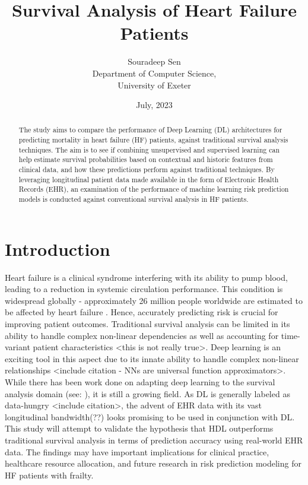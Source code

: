 \documentclass[%
 reprint,
 amsmath,amssymb,
 aps,
]{revtex4-2}
\begin{document}


\title{Survival Analysis of Heart Failure Patients}%
\author{Souradeep Sen \\
	 \small Department of Computer Science, \\ 
	 \small University of Exeter
	}

\date{July, 2023}%

\begin{abstract}
The study aims to compare the performance of Deep Learning (DL) architectures for predicting mortality in heart failure (HF) patients, against traditional survival analysis techniques. The aim is to see if combining unsupervised and supervised learning can help estimate survival probabilities based on contextual and historic features from clinical data, and how these predictions perform against traditional techniques. By leveraging longitudinal patient data made available in the form of Electronic Health Records (EHR), an examination of the performance of machine learning risk prediction models is conducted against conventional survival analysis in HF patients.
\end{abstract}

\maketitle

\section{\label{intro}Introduction}
Heart failure is a clinical syndrome interfering with its ability to pump blood, leading to a reduction in systemic circulation performance. This condition is widespread globally - approximately 26 million people worldwide are estimated to be affected by heart failure \cite{Savarese_Lund_2017}. Hence, accurately predicting risk is crucial for improving patient outcomes. Traditional survival analysis can be limited in its ability to handle complex non-linear dependencies as well as accounting for time-variant patient characteristics <this is not really true>. Deep learning is an exciting tool in this aspect due to its innate ability to handle complex non-linear relationships <include citation - NNs are universal function approximators>. While there has been work done on adapting deep learning to the survival analysis domain (see: ), it is still a growing field. As DL is generally labeled as data-hungry <include citation>, the advent of EHR data with its vast longitudinal bandwidth(??) looks promising to be used in conjunction with DL. This study will attempt to validate the hypothesis that HDL outperforms traditional survival analysis in terms of prediction accuracy using real-world EHR data. The findings may have important implications for clinical practice, healthcare resource allocation, and future research in risk prediction modeling for HF patients with frailty.
\end{document}
